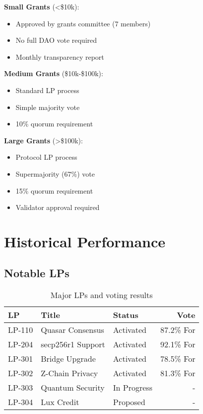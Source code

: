 \documentclass[11pt,a4paper]{article}
\begin{document}
\textbf{Small Grants} (<\$10k):
\begin{itemize}
\item Approved by grants committee (7 members)
\item No full DAO vote required
\item Monthly transparency report
\end{itemize}

\textbf{Medium Grants} (\$10k-\$100k):
\begin{itemize}
\item Standard LP process
\item Simple majority vote
\item 10\% quorum requirement
\end{itemize}

\textbf{Large Grants} (>\$100k):
\begin{itemize}
\item Protocol LP process
\item Supermajority (67\%) vote
\item 15\% quorum requirement
\item Validator approval required
\end{itemize}

\section{Historical Performance}

\subsection{Notable LPs}

\begin{table}[h]
\centering
\begin{tabular}{@{}lllr@{}}
\toprule
\textbf{LP} & \textbf{Title} & \textbf{Status} & \textbf{Vote} \\ \midrule
LP-110 & Quasar Consensus & Activated & 87.2\% For \\
LP-204 & secp256r1 Support & Activated & 92.1\% For \\
LP-301 & Bridge Upgrade & Activated & 78.5\% For \\
LP-302 & Z-Chain Privacy & Activated & 81.3\% For \\
LP-303 & Quantum Security & In Progress & - \\
LP-304 & Lux Credit & Proposed & - \\ \bottomrule
\end{tabular}
\caption{Major LPs and voting results}
\end{table}
\end{document}
